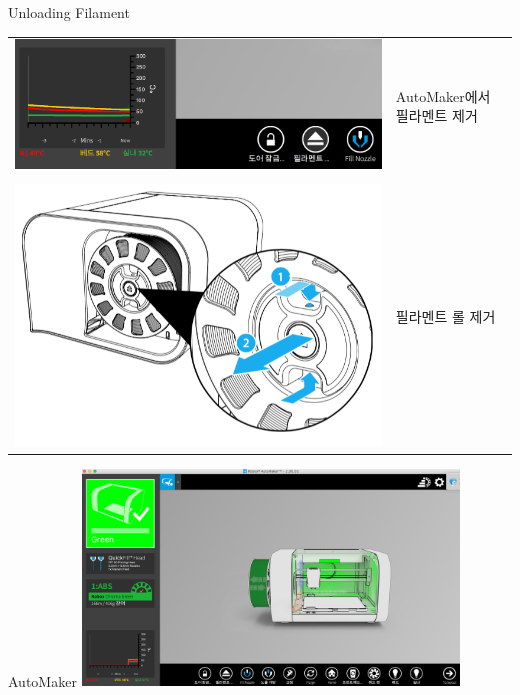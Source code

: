 \documentclass[11pt]{beamer}
\begin{document}
\begin{frame}[t]{Unloading Filament}\footnotesize
\begin{tabular}{c l}
\includegraphics[width=0.5\textheight]{./image/17_26.png}&AutoMaker에서 필라멘트 제거\\ &\\
\includegraphics[width=0.5\textheight]{./image/17_13.png}&필라멘트 롤 제거 
\end{tabular}
\end{frame}

\begin{frame}[t]{AutoMaker}\footnotesize
\centering
\includegraphics[width=10cm]{./image/17_15.png}
\end{frame}
\end{document}
